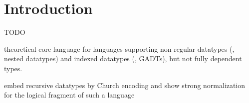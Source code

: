 \section{Introduction}
\label{sec:intro}
TODO

theoretical core language for languages supporting
non-regular datatypes (\eg, nested datatypes) and
indexed datatypes (\eg, GADTs), but not fully dependent types.

embed recursive datatypes by Church encoding and show strong normalization
for the logical fragment of such a language

